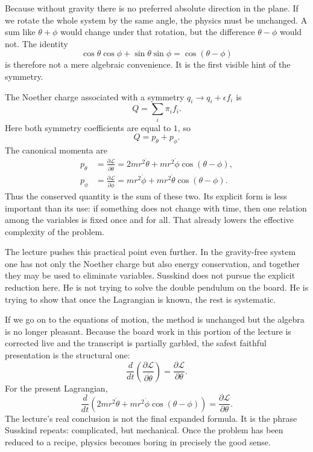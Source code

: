 Because without gravity there is no preferred absolute direction in the plane. If we rotate the whole system by the same angle, the physics must be unchanged. A sum like \(\theta+\phi\) would change under that rotation, but the difference \(\theta-\phi\) would not. The identity
\begin{equation}
\cos\theta\cos\phi+\sin\theta\sin\phi=\cos(\theta-\phi)
\end{equation}
is therefore not a mere algebraic convenience. It is the first visible hint of the symmetry.

The Noether charge associated with a symmetry \(q_i\to q_i+\epsilon f_i\) is
\begin{equation}
Q=\sum_i \pi_i f_i.
\end{equation}
Here both symmetry coefficients are equal to \(1\), so
\begin{equation}
Q=p_\theta+p_\phi.
\end{equation}
The canonical momenta are
\begin{align}
p_\theta
&=
\frac{\partial\mathcal{L}}{\partial\dot\theta}
=
2mr^2\dot\theta+mr^2\dot\phi\cos(\theta-\phi),\\
p_\phi
&=
\frac{\partial\mathcal{L}}{\partial\dot\phi}
=
mr^2\dot\phi+mr^2\dot\theta\cos(\theta-\phi).
\end{align}
Thus the conserved quantity is the sum of these two. Its explicit form is less important than its use: if something does not change with time, then one relation among the variables is fixed once and for all. That already lowers the effective complexity of the problem.

The lecture pushes this practical point even further. In the gravity-free system one has not only the Noether charge but also energy conservation, and together they may be used to eliminate variables. Susskind does not pursue the explicit reduction here. He is not trying to solve the double pendulum on the board. He is trying to show that once the Lagrangian is known, the rest is systematic.

If we go on to the equations of motion, the method is unchanged but the algebra is no longer pleasant. Because the board work in this portion of the lecture is corrected live and the transcript is partially garbled, the safest faithful presentation is the structural one:
\begin{equation}
\frac{d}{dt}\left(\frac{\partial\mathcal{L}}{\partial\dot\theta}\right)
=
\frac{\partial\mathcal{L}}{\partial\theta}.
\end{equation}
For the present Lagrangian,
\begin{equation}
\frac{d}{dt}
\left(
2mr^2\dot\theta+mr^2\dot\phi\cos(\theta-\phi)
\right)
=
\frac{\partial\mathcal{L}}{\partial\theta}.
\end{equation}
The lecture's real conclusion is not the final expanded formula. It is the phrase Susskind repeats: complicated, but mechanical. Once the problem has been reduced to a recipe, physics becomes boring in precisely the good sense.

